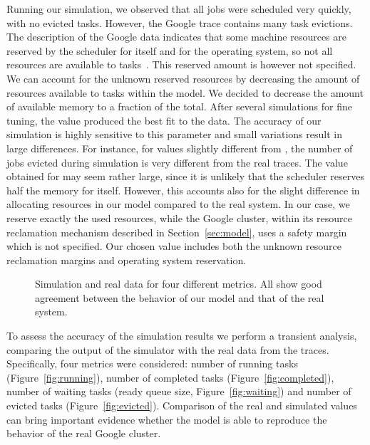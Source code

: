 \documentclass{article}
\begin{document}
Running our simulation, we observed that all jobs were scheduled very quickly, with no evicted tasks. However, the Google trace contains many task evictions. The description of the Google data indicates that some machine resources are reserved by the scheduler for itself and for the operating system, so not all resources are available to tasks~\cite{reissgoogle}. This reserved amount is however not specified. We can account for the unknown reserved resources by decreasing the amount of resources available to tasks within the model. We decided to decrease the amount of available memory to a fraction  of the total. After several simulations for fine tuning, the value  produced the best fit to the data. The accuracy of our simulation is highly sensitive to this parameter and small variations result in large differences.  For instance, for values slightly different from , the number of jobs evicted during simulation is very different from the real traces.  The value obtained for  may seem rather large, since it is unlikely that the scheduler reserves half the memory for itself. However, this accounts also for the slight difference in allocating resources in our model compared to the real system. In our case, we reserve exactly the used resources, while the Google cluster, within its resource reclamation mechanism described in Section~\ref{sec:model}, uses a safety margin which is not specified. Our chosen value  includes both the unknown resource reclamation margins and operating system reservation. 
\begin{figure}
\centering
{}
 \qquad
    \qquad
    \qquad
\caption{Simulation and real data for four different metrics. All show good agreement between the behavior of our model and that of the real system.}      
\end{figure}

To assess the accuracy of the simulation results we perform a transient analysis, comparing the output of the simulator with the real data from the traces. Specifically, four metrics were considered: number of running tasks (Figure~\ref{fig:running}), number of completed tasks (Figure~\ref{fig:completed}), number of waiting tasks (ready queue size, Figure~\ref{fig:waiting}) and number of evicted tasks (Figure~\ref{fig:evicted}). Comparison of the real and simulated values can bring important evidence whether the model is able to reproduce the behavior of the real Google cluster. 
\end{document}

